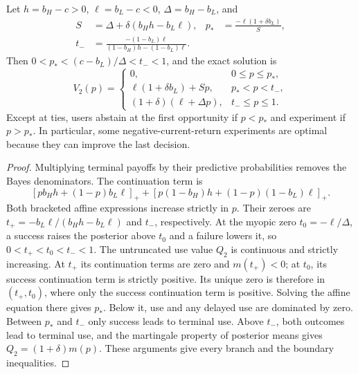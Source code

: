 \begin{proposition}\label{prop:bayes}
Let $h=b_H-c>0$, $\ell=b_L-c<0$, $\Delta=b_H-b_L$, and
\begin{align}
 S&=\Delta+\delta(b_Hh-b_L\ell),&
 p_*&=\frac{-\ell(1+\delta b_L)}{S},\\
 t_-&=\frac{-(1-b_L)\ell}{(1-b_H)h-(1-b_L)\ell}.
\end{align}
Then $0<p_*< (c-b_L)/\Delta<t_-<1$, and the exact solution is
\begin{equation}
 V_2(p)=\begin{cases}
 0,&0\leq p\leq p_*,\\
 \ell(1+\delta b_L)+Sp,&p_*<p<t_-,\\
 (1+\delta)(\ell+\Delta p),&t_-\leq p\leq1.
 \end{cases}\label{eq:piecewise}
\end{equation}
Except at ties, users abstain at the first opportunity if $p<p_*$ and experiment if $p>p_*$. In particular, some negative-current-return experiments are optimal because they can improve the last decision.
\end{proposition}
\begin{proof}
Multiplying terminal payoffs by their predictive probabilities removes the Bayes denominators. The continuation term is
\[
 [pb_Hh+(1-p)b_L\ell]_+
 +[p(1-b_H)h+(1-p)(1-b_L)\ell]_+.
\]
Both bracketed affine expressions increase strictly in $p$. Their zeroes are $t_+=-b_L\ell/(b_Hh-b_L\ell)$ and $t_-$, respectively. At the myopic zero $t_0=-\ell/\Delta$, a success raises the posterior above $t_0$ and a failure lowers it, so $0<t_+<t_0<t_-<1$. The untruncated use value $Q_2$ is continuous and strictly increasing. At $t_+$ its continuation terms are zero and $m(t_+)<0$; at $t_0$, its success continuation term is strictly positive. Its unique zero is therefore in $(t_+,t_0)$, where only the success continuation term is positive. Solving the affine equation there gives $p_*$. Below it, use and any delayed use are dominated by zero. Between $p_*$ and $t_-$ only success leads to terminal use. Above $t_-$, both outcomes lead to terminal use, and the martingale property of posterior means gives $Q_2=(1+\delta)m(p)$. These arguments give every branch and the boundary inequalities.
\end{proof}

